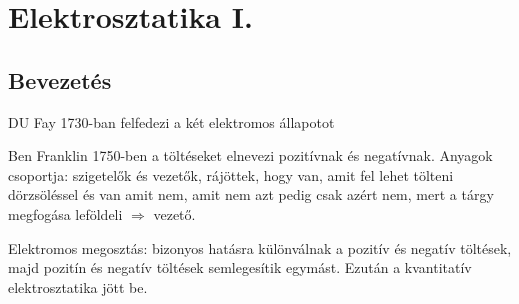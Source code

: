 \documentclass{article}
\begin{document}
\section{Elektrosztatika I.}
\subsection{Bevezetés}
DU Fay 1730-ban felfedezi a két elektromos állapotot

Ben Franklin 1750-ben a töltéseket elnevezi pozitívnak és negatívnak.
Anyagok csoportja: szigetelők és vezetők, rájöttek, hogy van, amit fel lehet tölteni dörzsöléssel és van amit nem, amit nem azt pedig csak azért nem, mert a tárgy megfogása leföldeli $\Rightarrow$ vezető.

Elektromos megosztás: bizonyos hatásra különválnak a pozitív és negatív töltések, majd pozitín és negatív töltések semlegesítik egymást. Ezután a kvantitatív elektrosztatika jött be.
\end{document}

